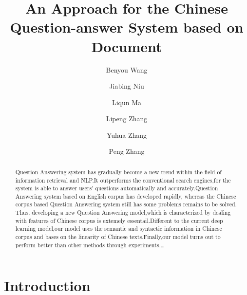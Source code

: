 \documentclass{llncs}
\begin{document}
%

\mainmatter              %
%
\title{An Approach for the Chinese Question-answer System based on Document}
%
%
\author{Benyou Wang \and Jiabing Niu \and Liqun Ma \and Lipeng Zhang \and Yuhua Zhang
\and Peng Zhang}
%
%
%



\maketitle              %

\begin{abstract}
Question Answering system has gradually become a new trend within the field of information retrieval and NLP.It outperforms the conventional search engines,for the system is able to answer users’ questions automatically and accurately.Question Answering system based on English corpus has developed rapidly, whereas the Chinese corpus based Question Answering system still has some problems remains to be solved. Thus, developing a new Question Answering model,which is characterized by dealing with features of Chinese corpus is extemely essentail.Different to the current deep learning model,our model uses the semantic and syntactic information in Chinese corpus and bases on the linearity of Chinese texts.Finally,our model turns out to perform better than other methods through experiments.\dots
{}
\end{abstract}
%
\section{Introduction}
%
\end{document}

